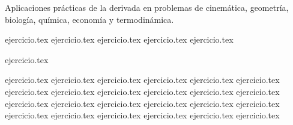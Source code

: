 
Aplicaciones prácticas de la derivada en problemas de cinemática, geometría, biología, química, economía y termodinámica.

\begin{enumerate}
    \begin{minipage}{0.45\textwidth}
    {ejercicio.tex}
    {ejercicio.tex}
    {ejercicio.tex}
    {ejercicio.tex}
    {ejercicio.tex}
    \end{minipage}%
    \begin{minipage}{0.45\textwidth}
    \setcounter{enumi}{5}
    {ejercicio.tex}
    \end{minipage}

    \setcounter{enumi}{6}
    {ejercicio.tex}
    {ejercicio.tex}
    {ejercicio.tex}
    {ejercicio.tex}
    {ejercicio.tex}
    {ejercicio.tex}
    {ejercicio.tex}
    {ejercicio.tex}
    {ejercicio.tex}
    {ejercicio.tex}
    {ejercicio.tex}
    {ejercicio.tex}
    {ejercicio.tex}
    {ejercicio.tex}
    {ejercicio.tex}
    {ejercicio.tex}
    {ejercicio.tex}
    {ejercicio.tex}
    {ejercicio.tex}
    {ejercicio.tex}
    \setcounter{enumi}{26}
    {ejercicio.tex}
    {ejercicio.tex}
    {ejercicio.tex}
    {ejercicio.tex}
\end{enumerate}
